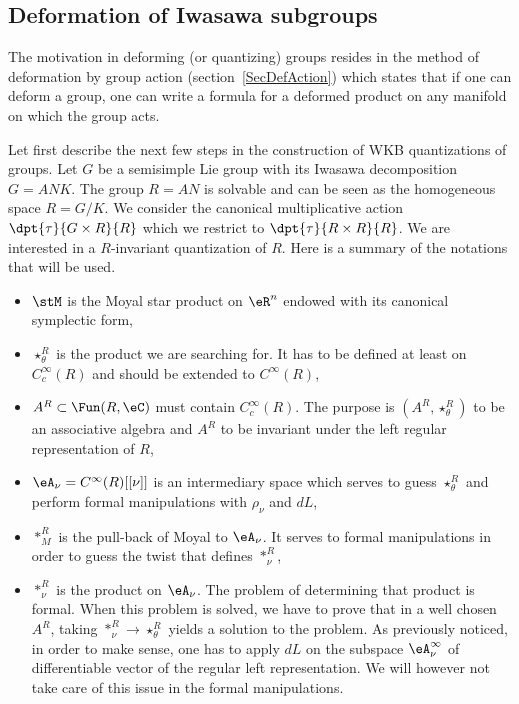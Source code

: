 \subsection{Deformation of Iwasawa subgroups}   %

The motivation in deforming (or quantizing) groups resides in the method of deformation by group action (section~\ref{SecDefAction}) which states that if one can deform a group, one can write a formula for a deformed product on any manifold on which the group acts.

Let first describe the next few steps in the construction of WKB quantizations of groups. Let $G$ be a semisimple Lie group with its Iwasawa decomposition $G=ANK$. The group $R=AN$ is solvable and can be seen as the homogeneous space $R=G/K$. We consider the canonical multiplicative action $\dpt{\tau}{G\times R}{R}$ which we restrict to $\dpt{\tau}{R\times R}{R}$. We are interested in a $R$-invariant quantization of $R$. Here is a summary of the notations that will be used.

\begin{itemize}
	\item $\stM$ is the Moyal star product on $\eR^n$ endowed with its canonical symplectic form,
	\item $\star^R_{\theta}$ is the product we are searching for. It has to be defined at least on $ C_c^{\infty}(R)$ and should be extended to $ C^{\infty}(R)$,
	\item $A^R\subset\Fun(R,\eC)$ must contain $ C^{\infty}_c(R)$. The purpose is $(A^R,\star^R_{\theta})$ to be an associative algebra and $A^R$ to be invariant under the left regular representation of $R$,
	\item $\eA_{\nu}= C^{\infty}(R)[ [\nu]]$ is an intermediary space which serves to guess $\star^R_{\theta}$ and perform formal manipulations with $\rho_{\nu}$ and $dL$,
	\item $\ast_M^R$ is the pull-back of Moyal to $\eA_{\nu}$. It serves to formal manipulations in order to guess the twist that defines $\ast^R_{\nu}$,
	\item $\ast^R_{\nu}$ is the product on $\eA_{\nu}$. The problem of determining that product is formal. When this problem is solved, we have to prove that in a well chosen $A^R$, taking $\ast_{\nu}^R\to\star^R_{\theta}$ yields a solution to the problem. As previously noticed, in order to make sense, one has to apply $dL$ on the subspace $\eA_{\nu}^{\infty}$ of differentiable vector of the regular left representation. We will however not take care of this issue in the formal manipulations.
\end{itemize}

